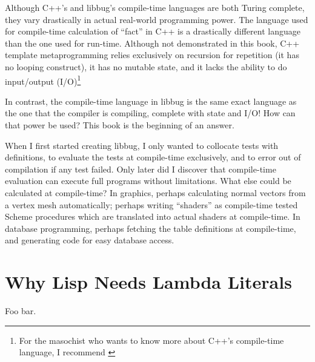 Although C++'s and libbug's compile-time languages are both Turing complete,
 they vary drastically in actual real-world programming power.  The language used
 for compile-time calculation of ``fact'' in C++ is a drastically different language than
 the one used for run-time.  Although not demonstrated in this book,
 C++ template metaprogramming relies exclusively on recursion for repetition (it has no
 looping construct), it has no mutable state, and it lacks the ability to do input/output
 (I/O)\footnote{For the masochist who wants to know more about C++'s compile-time language,
 I recommend \cite{ctm} }

 In contrast, the compile-time
 language in libbug is the same exact language as the one that the compiler
 is compiling, complete with state and I/O!  How can that power be used?
 This book is the beginning of an answer.


 When I first started creating libbug, I only wanted to collocate
 tests with definitions, to evaluate the tests at compile-time exclusively, and to error out
 of compilation
 if any test failed.  Only later did I discover that compile-time evaluation
 can execute full programs without limitations.  What else could be
 calculated at compile-time?  In graphics, perhaps calculating normal vectors
 from a vertex mesh automatically; perhaps writing ``shaders'' as compile-time
 tested Scheme procedures which are translated into actual shaders at compile-time.
 In database programming, perhaps fetching the table definitions at compile-time,
 and generating code for easy database access.


 \chapter{Why Lisp Needs Lambda Literals}
  \label{sec:appendixliteral}

 Foo bar.


